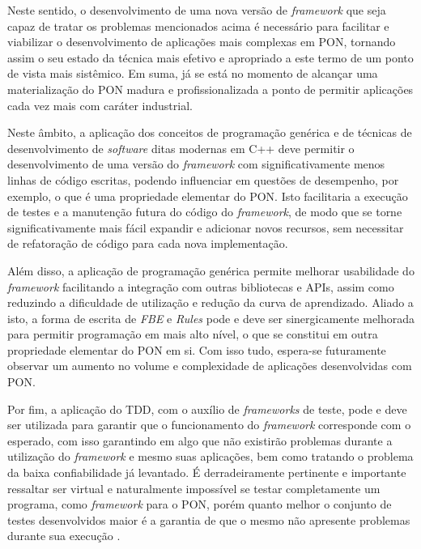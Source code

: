 Neste sentido, o desenvolvimento de uma nova versão de \textit{framework} que
seja capaz de tratar os problemas mencionados acima é necessário para facilitar
e viabilizar o desenvolvimento de aplicações mais complexas em PON, tornando
assim o seu estado da técnica mais efetivo e apropriado a este termo de um ponto
de vista mais sistêmico. Em suma, já se está no momento de alcançar uma
materialização do PON madura e profissionalizada a ponto de permitir aplicações
cada vez mais com caráter industrial.

Neste âmbito, a aplicação dos conceitos de programação genérica e de
técnicas de desenvolvimento de \textit{software} ditas modernas em C++ deve
permitir o desenvolvimento de uma versão do \textit{framework} com
significativamente menos linhas de código escritas, podendo influenciar em questões
de desempenho, por exemplo, o que é uma propriedade elementar do PON. Isto
facilitaria a execução de testes e a manutenção futura do código do
\textit{framework}, de modo que se torne significativamente mais fácil expandir
e adicionar novos recursos, sem necessitar de refatoração de código para cada
nova implementação.

Além disso, a aplicação de programação genérica permite melhorar usabilidade do
\textit{framework} facilitando a integração com outras bibliotecas e APIs, assim
como reduzindo a dificuldade de utilização e redução da curva de aprendizado.
Aliado a isto, a forma de escrita de \textit{FBE} e \textit{Rules} pode e deve
ser sinergicamente melhorada para permitir programação em mais alto nível, o que
se constitui em outra propriedade elementar do PON em si. Com isso tudo, espera-se
futuramente observar um aumento no volume e complexidade de aplicações
desenvolvidas com PON.

Por fim, a aplicação do TDD, com o auxílio de \textit{frameworks} de teste, pode
e deve ser utilizada para garantir que o funcionamento do \textit{framework}
corresponde com o esperado, com isso garantindo em algo que não existirão
problemas durante a utilização do \textit{framework} e mesmo suas aplicações,
bem como tratando o problema da baixa confiabilidade já levantado. É
derradeiramente pertinente e importante ressaltar ser virtual e naturalmente
impossível se testar completamente um programa, como \textit{framework} para o
PON, porém quanto melhor o conjunto de testes desenvolvidos maior é a garantia
de que o mesmo não apresente problemas durante sua execução \cite{testing_2008}.
